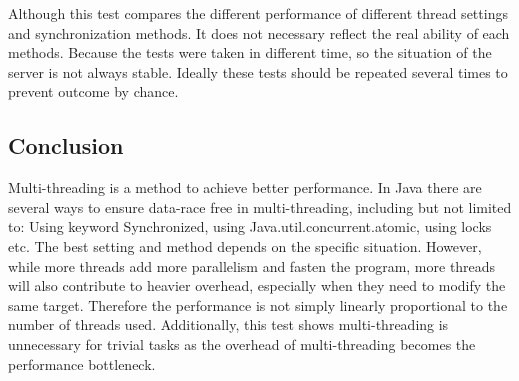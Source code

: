 \documentclass[letterpaper,twocolumn,10pt]{article}
\begin{document}
Although this test compares the different performance of different thread settings and synchronization methods. It does not necessary reflect the real ability of each methods. Because the tests were taken in different time, so the situation of the server is not always stable. Ideally these tests should be repeated several times to prevent outcome by chance.




\subsection*{Conclusion}
Multi-threading is a method to achieve better performance. In Java there are several ways to ensure data-race free in multi-threading, including but not limited to: Using keyword Synchronized, using Java.util.concurrent.atomic, using locks etc. The best setting and method depends on the specific situation. However, while more threads add more parallelism and fasten the program, more threads will also contribute to heavier overhead, especially when they need to modify the same target. Therefore the performance is not simply linearly proportional to the number of threads used. Additionally, this test shows multi-threading is unnecessary for trivial tasks as the overhead of multi-threading becomes the performance bottleneck.
\end{document}
